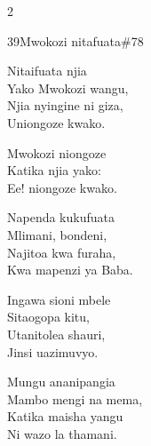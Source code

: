 \begin{multicols}{2}
\begin{hymn}{39}{Mwokozi nitafuata}{\#78}
\begin{stanza}
Nitaifuata njia\\
Yako Mwokozi wangu,\\
Njia nyingine ni giza,\\
Uniongoze kwako.
\end{stanza}
\begin{chorus}
Mwokozi niongoze\\
Katika njia yako:\\
Ee! niongoze kwako.
\end{chorus}
\begin{stanza}
Napenda kukufuata\\
Mlimani, bondeni,\\
Najitoa kwa furaha,\\
Kwa mapenzi ya Baba.
\end{stanza}
\begin{stanza}
Ingawa sioni mbele\\
Sitaogopa kitu,\\
Utanitolea shauri,\\
Jinsi uazimuvyo.
\end{stanza}
\begin{stanza}
Mungu ananipangia\\
Mambo mengi na mema,\\
Katika maisha yangu\\
Ni wazo la thamani.
\end{stanza}
\end{hymn}


\end{multicols}
